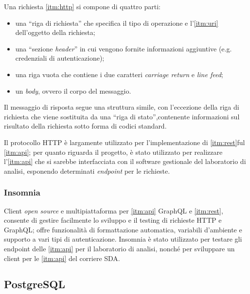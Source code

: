 Una richiesta \ref{itm:http} si compone di quattro parti:
\begin{itemize}
    \item una ``riga di richiesta'' che specifica il tipo di operazione e l'\ref{itm:uri} dell'oggetto della richiesta;
    \item una ``sezione \textit{header}'' in cui vengono fornite informazioni aggiuntive (e.g. credenziali di autenticazione);
    \item una riga vuota che contiene i due caratteri \textit{carriage return} e \textit{line feed};
    \item un \textit{body}, ovvero il corpo del messaggio.
\end{itemize}

Il messaggio di risposta segue una struttura simile, con l'eccezione della riga di richiesta che viene sostituita da una ``riga di stato'',contenente informazioni sul risultato della richiesta sotto forma di codici standard.

Il protocollo HTTP è largamente utilizzato per l'implementazione di \ref{itm:rest}ful \ref{itm:api}; per quanto riguarda il progetto, è stato utilizzato per realizzare l'\ref{itm:api} che si sarebbe interfacciata con il software gestionale del laboratorio di analisi, esponendo determinati \textit{endpoint} per le richieste.

\subsubsection{Insomnia}
Client \textit{open source} e multipiattaforma per \ref{itm:api} GraphQL e \ref{itm:rest}, consente di gestire facilmente lo sviluppo e il testing di richieste HTTP e GraphQL; offre funzionalità di formattazione automatica, variabili d'ambiente e supporto a vari tipi di autenticazione. Insomnia è stato utilizzato per testare gli endpoint delle \ref{itm:api} per il laboratorio di analisi, nonché per sviluppare un client per le \ref{itm:api} del corriere SDA.

\subsection{PostgreSQL}







